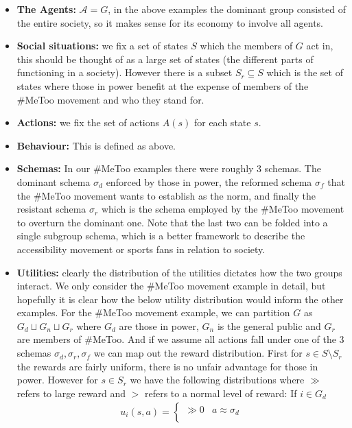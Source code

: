 \documentclass[12pt]{article}
\begin{document}
\begin{itemize}
    \item \textbf{The Agents:} $\mathcal A = G$, in the above examples the dominant group consisted
    of the entire society, so it makes sense for its economy to involve all agents.
    \item \textbf{Social situations:} we fix a set of states $S$ which the members of $G$ act in,
    this should be thought of as a large set of states (the different parts of functioning in a society).
    However there is a subset $S_r \subseteq S$ which is the set of states where those in power benefit at
    the expense of members of the \#MeToo movement and who they stand for. 
    \item \textbf{Actions:} we fix the set of actions $A(s)$ for each state $s$.
    \item \textbf{Behaviour:} This is defined as above.
    \item \textbf{Schemas:} In our \#MeToo examples there were roughly 3 schemas. The dominant schema $\sigma_d$
    enforced by those in power, the reformed schema $\sigma_f$ that the \#MeToo movement wants to establish as the norm,
    and finally the resistant schema $\sigma_r$ which is the schema employed by the \#MeToo movement to overturn the dominant one.
    Note that the last two can be folded into a single subgroup schema, which is a better framework to describe
    the accessibility movement or sports fans in relation to society.
    \item \textbf{Utilities:} clearly the distribution of the utilities dictates how the two groups interact.
    We only consider the \#MeToo movement example in detail, but hopefully it is clear how the below utility distribution
    would inform the other examples. For the \#MeToo movement example, we can partition $G$
    as $G_d \sqcup G_n \sqcup G_r$ where $G_d$ are those in power, $G_n$ is the general public
    and $G_r$ are members of \#MeToo. And if we assume all actions fall under one of the 3
    schemas $\sigma_d, \sigma_r, \sigma_f$ we can map out the reward distribution.
    First for $s \in S \setminus S_r$ the rewards are fairly uniform, there is no unfair
    advantage for those in power. However for $s \in S_r$ we have the following distributions where $\gg$ refers to large reward
    and $>$ refers to a normal level of reward:
    If $i \in G_d$
    \begin{align*}
        u_i(s, a) = \begin{cases}
            \gg 0 & a \approx \sigma_d \\

\end{cases}
\end{align*}
\end{itemize}
\end{document}
